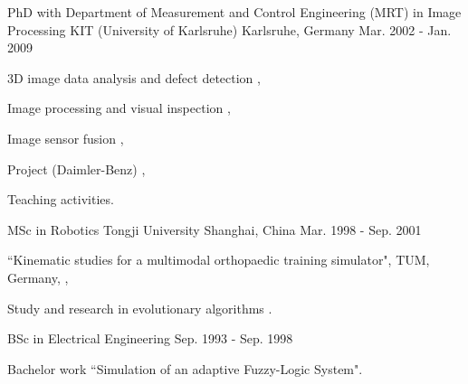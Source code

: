 \documentclass[../cv_xin.tex]{subfiles}
\begin{document}
\begin{cventries}
  \cventry
    {PhD with Department of Measurement and Control Engineering (MRT) in Image Processing} %
    {KIT (University of Karlsruhe)} %
    {Karlsruhe, Germany} %
    {Mar. 2002 - Jan. 2009} %
    {
      \begin{cvitems} %
        \item 3D image data analysis and defect detection \supercite{xin2008diss},
        \item Image processing and visual inspection \supercite{xin2009multiscale} \supercite{xin2007evaluation},
        \item Image sensor fusion \supercite{xin2004bildfolgenauswertung},
        \item Project (Daimler-Benz) \supercite{Xin_Daimler_08},
        \item Teaching activities.
      \end{cvitems}
    }

  \cventry
    {MSc in Robotics} %
    {Tongji University} %
    {Shanghai, China} %
    {Mar. 1998 - Sep. 2001} %
    {
      \begin{cvitems} %
        \item ``Kinematic studies for a multimodal orthopaedic training simulator", TUM, Germany, \supercite{xin2002KneeSimulator},
        \item Study and research in evolutionary algorithms \supercite{xin2002AntColony}.
      \end{cvitems}
    }

  \cventry
    {BSc in Electrical Engineering} %
    {} %
    {} %
    {Sep. 1993 - Sep. 1998} %
    {
      \begin{cvitems} %
        \item Bachelor work ``Simulation of an adaptive Fuzzy-Logic System".
      \end{cvitems}
    }

\end{cventries}
\end{document}
